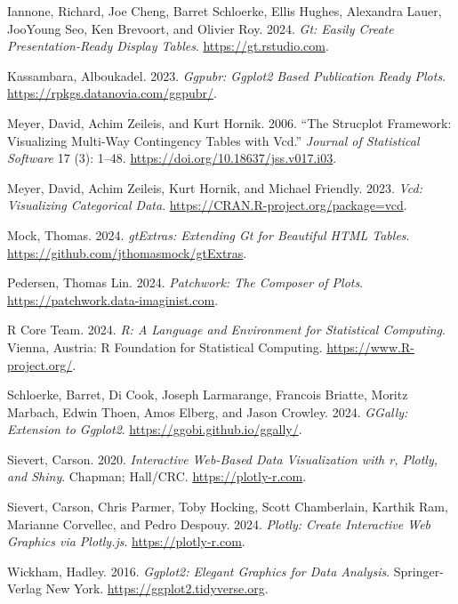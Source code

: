 \documentclass[
  letterpaper,
  DIV=11,
  numbers=noendperiod]{scrartcl}
\newlength{\cslhangindent}
\newenvironment{CSLReferences}[2] %
 {\begin{list}{}{%
  \setlength{\itemindent}{0pt}
  \setlength{\leftmargin}{0pt}
  \setlength{\parsep}{0pt}
  \ifodd #1
   \setlength{\leftmargin}{\cslhangindent}
   \setlength{\itemindent}{-1\cslhangindent}
  \fi
  \setlength{\itemsep}{#2\baselineskip}}}
 {\end{list}}
\begin{document}
\label{refs}
\begin{CSLReferences}{1}{0}
Iannone, Richard, Joe Cheng, Barret Schloerke, Ellis Hughes, Alexandra
Lauer, JooYoung Seo, Ken Brevoort, and Olivier Roy. 2024. \emph{Gt:
Easily Create Presentation-Ready Display Tables}.
\url{https://gt.rstudio.com}.

Kassambara, Alboukadel. 2023. \emph{Ggpubr: Ggplot2 Based Publication
Ready Plots}. \url{https://rpkgs.datanovia.com/ggpubr/}.

Meyer, David, Achim Zeileis, and Kurt Hornik. 2006. {``The Strucplot
Framework: Visualizing Multi-Way Contingency Tables with Vcd.''}
\emph{Journal of Statistical Software} 17 (3): 1--48.
\url{https://doi.org/10.18637/jss.v017.i03}.

Meyer, David, Achim Zeileis, Kurt Hornik, and Michael Friendly. 2023.
\emph{Vcd: Visualizing Categorical Data}.
\url{https://CRAN.R-project.org/package=vcd}.

Mock, Thomas. 2024. \emph{gtExtras: Extending Gt for Beautiful HTML
Tables}. \url{https://github.com/jthomasmock/gtExtras}.

Pedersen, Thomas Lin. 2024. \emph{Patchwork: The Composer of Plots}.
\url{https://patchwork.data-imaginist.com}.

R Core Team. 2024. \emph{R: A Language and Environment for Statistical
Computing}. Vienna, Austria: R Foundation for Statistical Computing.
\url{https://www.R-project.org/}.

Schloerke, Barret, Di Cook, Joseph Larmarange, Francois Briatte, Moritz
Marbach, Edwin Thoen, Amos Elberg, and Jason Crowley. 2024.
\emph{GGally: Extension to Ggplot2}.
\url{https://ggobi.github.io/ggally/}.

Sievert, Carson. 2020. \emph{Interactive Web-Based Data Visualization
with r, Plotly, and Shiny}. Chapman; Hall/CRC.
\url{https://plotly-r.com}.

Sievert, Carson, Chris Parmer, Toby Hocking, Scott Chamberlain, Karthik
Ram, Marianne Corvellec, and Pedro Despouy. 2024. \emph{Plotly: Create
Interactive Web Graphics via Plotly.js}. \url{https://plotly-r.com}.

Wickham, Hadley. 2016. \emph{Ggplot2: Elegant Graphics for Data
Analysis}. Springer-Verlag New York.
\url{https://ggplot2.tidyverse.org}.


\end{CSLReferences}
\end{document}
